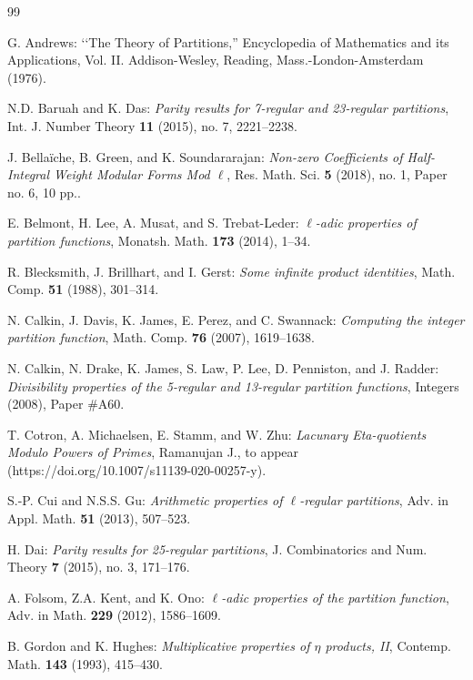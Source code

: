 \documentclass[12pt]{amsart}
\theoremstyle{definition}
\begin{document}
\begin{thebibliography}{99}

 G. Andrews: \lq \lq The Theory of Partitions,'' Encyclopedia of Mathematics and its Applications, Vol. II. Addison-Wesley, Reading, Mass.-London-Amsterdam (1976).

 N.D. Baruah and K. Das: \emph{Parity results for 7-regular and 23-regular partitions}, Int. J. Number Theory \textbf{11} (2015), no. 7, 2221--2238.

 J. Bella\"iche, B. Green, and K. Soundararajan: \emph{Non-zero Coefficients of Half-Integral Weight Modular Forms Mod $\ell$}, Res. Math. Sci. \textbf{5} (2018), no. 1, Paper no. 6, 10 pp..

 E. Belmont, H. Lee, A. Musat, and S. Trebat-Leder: \emph{$\ell$-adic properties of partition functions}, Monatsh. Math. \textbf{173} (2014), 1--34. %

 R. Blecksmith, J.  Brillhart, and I. Gerst: \emph{Some infinite product identities}, Math. Comp. \textbf{51}  (1988), 301--314.

 N. Calkin, J. Davis, K. James, E. Perez, and C. Swannack: \emph{Computing the integer partition function}, Math. Comp. \textbf{76} (2007), 1619--1638.

 N. Calkin, N. Drake, K. James, S. Law, P. Lee, D. Penniston, and J. Radder: \emph{Divisibility properties of the 5-regular and 13-regular partition functions}, Integers (2008), Paper \#A60. %

 T. Cotron, A. Michaelsen, E. Stamm, and W. Zhu: \emph{Lacunary Eta-quotients Modulo Powers of Primes}, Ramanujan J., to appear (https://doi.org/10.1007/s11139-020-00257-y).

 S.-P. Cui and N.S.S. Gu: \emph{Arithmetic properties of $\ell$-regular partitions}, Adv. in Appl. Math. \textbf{51} (2013), 507--523.

 H. Dai: \emph{Parity results for 25-regular partitions}, J. Combinatorics and Num. Theory \textbf{7} (2015), no. 3, 171--176.

 A. Folsom, Z.A. Kent, and K. Ono: \emph{$\ell$-adic properties of the partition function}, Adv. in Math. \textbf{229} (2012), 1586--1609.

 B. Gordon and K. Hughes: \emph{Multiplicative properties of $\eta$ products, II},  Contemp. Math. \textbf{143} (1993), 415--430.


\end{thebibliography}
\end{document}
